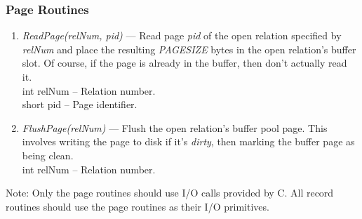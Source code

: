 \subsubsection{Page Routines}
\begin{enumerate}
\item
\emph{ReadPage(relNum, pid)} --- Read page \emph{pid} of the open
relation specified by \emph{relNum} and place the resulting \emph{PAGESIZE}
bytes in the open relation's buffer slot.
Of course, if the page is already in the buffer, then don't actually
read it.
\\
int relNum -- Relation number.
\\
short pid -- Page identifier.
\item
\emph{FlushPage(relNum)} --- Flush the open relation's buffer pool page.  This
involves writing the page to disk if it's \emph{dirty}, then marking the buffer
page as being clean.
\\
int relNum -- Relation number.
\end{enumerate}
Note: Only the page routines should use I/O calls provided by C.
All record routines should
use the page routines as their I/O primitives.

